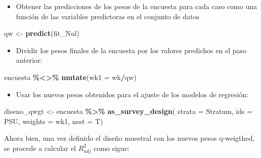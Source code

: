 \documentclass[
  spanish,
  12pt,
]{book}
\newenvironment{Shaded}{\begin{snugshade}}{\end{snugshade}}
\newcommand{\AttributeTok}[1]{\textcolor[rgb]{0.13,0.29,0.53}{#1}}
\newcommand{\DecValTok}[1]{\textcolor[rgb]{0.00,0.00,0.81}{#1}}
\newcommand{\FunctionTok}[1]{\textcolor[rgb]{0.13,0.29,0.53}{\textbf{#1}}}
\newcommand{\NormalTok}[1]{#1}
\newcommand{\OtherTok}[1]{\textcolor[rgb]{0.56,0.35,0.01}{#1}}
\newcommand{\SpecialCharTok}[1]{\textcolor[rgb]{0.81,0.36,0.00}{\textbf{#1}}}
\providecommand{\tightlist}{%
  \setlength{\itemsep}{0pt}\setlength{\parskip}{0pt}}
\begin{document}
\begin{itemize}
\tightlist
\item
  Obtener las predicciones de los pesos de la encuesta para cada caso como una función de las variables predictoras en el conjunto de datos
\end{itemize}

\begin{Shaded}
\begin{Highlighting}[]
\NormalTok{qw }\OtherTok{\textless{}{-}} \FunctionTok{predict}\NormalTok{(fit\_Nul)}
\end{Highlighting}
\end{Shaded}

\begin{itemize}
\tightlist
\item
  Dividir los pesos finales de la encuesta por los valores predichos en el paso anterior:
\end{itemize}

\begin{Shaded}
\begin{Highlighting}[]
\NormalTok{encuesta }\SpecialCharTok{\%\textless{}\textgreater{}\%} \FunctionTok{mutate}\NormalTok{(}\AttributeTok{wk1 =}\NormalTok{ wk}\SpecialCharTok{/}\NormalTok{qw)}
\end{Highlighting}
\end{Shaded}

\begin{itemize}
\tightlist
\item
  Usar los nuevos pesos obtenidos para el ajuste de los modelos de regresión:
\end{itemize}

\begin{Shaded}
\begin{Highlighting}[]
\NormalTok{diseno\_qwgt }\OtherTok{\textless{}{-}}\NormalTok{ encuesta }\SpecialCharTok{\%\textgreater{}\%}
  \FunctionTok{as\_survey\_design}\NormalTok{(}
    \AttributeTok{strata =}\NormalTok{ Stratum,}
    \AttributeTok{ids =}\NormalTok{ PSU,}
    \AttributeTok{weights =}\NormalTok{ wk1,}
    \AttributeTok{nest =}\NormalTok{ T)}
\end{Highlighting}
\end{Shaded}

Ahora bien, una vez definido el diseño muestral con los nuevos pesos q-weigthed, se procede a calcular el \(R_{adj}^{2}\) como sigue:

\begin{Shaded}
\end{Shaded}
\end{document}
